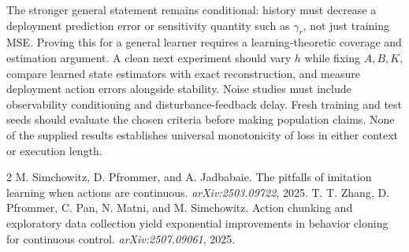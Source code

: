 \documentclass[11pt]{article}
\begin{document}
The stronger general statement remains conditional: history must decrease a deployment prediction error or sensitivity quantity such as $\gamma_r$, not just training MSE. Proving this for a general learner requires a learning-theoretic coverage and estimation argument. A clean next experiment should vary $h$ while fixing $A,B,K$, compare learned state estimators with exact reconstruction, and measure deployment action errors alongside stability. Noise studies must include observability conditioning and disturbance-feedback delay. Fresh training and test seeds should evaluate the chosen criteria before making population claims. None of the supplied results establishes universal monotonicity of loss in either context or execution length.

\begin{thebibliography}{2}
M. Simchowitz, D. Pfrommer, and A. Jadbabaie.
The pitfalls of imitation learning when actions are continuous.
\emph{arXiv:2503.09722}, 2025.
T. T. Zhang, D. Pfrommer, C. Pan, N. Matni, and M. Simchowitz.
Action chunking and exploratory data collection yield exponential improvements in behavior cloning for continuous control.
\emph{arXiv:2507.09061}, 2025.
\end{thebibliography}
\end{document}
